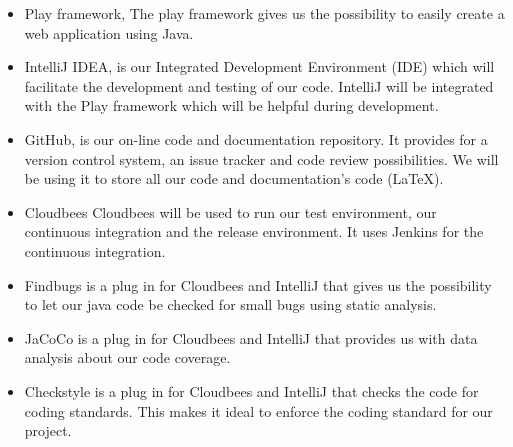 \begin{itemize}
\item Play framework,
The play framework gives us the possibility to easily create a web application using Java.
\item IntelliJ IDEA, is our Integrated Development Environment (IDE) which will facilitate the development and testing of our code.
IntelliJ will be integrated with the Play framework which will be helpful during development.
\item GitHub, is our on-line code and documentation repository.
It provides for a version control system, an issue tracker and code review possibilities.
We will be using it to store all our code and documentation's code (LaTeX).
\item Cloudbees
Cloudbees will be used to run our test environment, our continuous integration and the release environment.
It uses Jenkins for the continuous integration.
\item Findbugs is a plug in for Cloudbees and IntelliJ that gives us the possibility to let our java code be checked for small bugs using static analysis.
\item JaCoCo is a plug in for Cloudbees and IntelliJ that provides us with data analysis about our code coverage.
\item Checkstyle is a plug in for Cloudbees and IntelliJ that checks the code for coding standards.
This makes it ideal to enforce the coding standard for our project.
\end{itemize}
